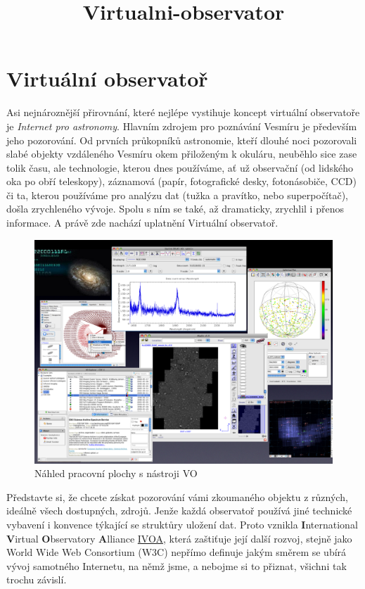 \documentclass{report}
\title{Virtualni-observator}
\begin{document}
    
    
    
    

    
    \chapter*{Virtuální observatoř}\label{virtuuxe1lnuxed-observatoux159}

    Asi nejnároznější přirovnání, které nejlépe vystihuje koncept virtuální
observatoře je \emph{Internet pro astronomy}. Hlavním zdrojem pro
poznávání Vesmíru je především jeho pozorování. Od prvních průkopníků
astronomie, kteří dlouhé noci pozorovali slabé objekty vzdáleného
Vesmíru okem přiloženým k okuláru, neuběhlo sice zase tolik času, ale
technologie, kterou dnes používáme, ať už observační (od lidského oka po
obří teleskopy), záznamová (papír, fotografické desky, fotonásobiče,
CCD) či ta, kterou používáme pro analýzu dat (tužka a pravítko, nebo
superpočítač), došla zrychleného vývoje. Spolu s ním se také, až
dramaticky, zrychlil i přenos informace. A právě zde nachází uplatnění
Virtuální observatoř.

    \begin{figure}[htbp]
\centering
\includegraphics[width=\linewidth]{../images/votoolsworkshop.png}
\caption{Náhled pracovní plochy s nástroji VO}
\end{figure}

    Představte si, že chcete získat pozorování vámi zkoumaného objektu z
různých, ideálně všech dostupných, zdrojů. Jenže každá observatoř
používá jiné technické vybavení i konvence týkající se struktůry uložení
dat. Proto vznikla \textbf{I}nternational \textbf{V}irtual
\textbf{O}bservatory \textbf{A}lliance
\href{http://www.ivoa.net/}{IVOA}, která zaštiťuje její další rozvoj,
stejně jako World Wide Web Consortium (W3C) nepřímo definuje jakým
směrem se ubírá vývoj samotného Internetu, na němž jsme, a nebojme si to
přiznat, všichni tak trochu závislí.
\end{document}
